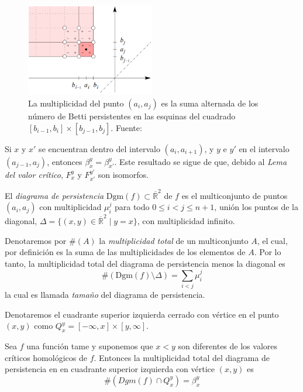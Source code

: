 \begin{figure}[!ht]
\centering
\includegraphics[width=0.5\textwidth]{include/figuras/multiplicidadEsquinas.png} 
\caption{La multiplicidad del punto $(a_i, a_j)$ es la suma alternada de los número de Betti persistentes en las esquinas del cuadrado $[b_{i-1}, b_i]\times[b_{j-1}, b_j]$. Fuente: \cite{Cohen-Steiner2007}}
\label{ref:multiplicidadDiagrama}
\end{figure}

\begin{remark}
Si $x$ y $x'$ se encuentran dentro del intervalo $(a_i, a_{i+1})$, y $y$ e $y'$ en el intervalo $(a_{j-1}, a_j)$, entonces $\beta_{x}^{y} = \beta_{x'}^{y}$. Este resultado se sigue de que, debido al \emph{Lema del valor crítico}, $F_{x}^{y}$ y $F_{x'}^{y'}$ son isomorfos.
\end{remark}

\begin{definition}
El \emph{diagrama de persistencia} $\text{Dgm}(f) \subset \overline{\mathbb{R}}^2$ de $f$ es el multiconjunto de puntos $(a_i, a_j)$ con multiplicidad $\mu_{i}^{j}$ para todo $0 \leq i < j \leq n+1$, unión los puntos de la diagonal, $\Delta=\{(x, y) \in \overline{\mathbb{R}}^2 \mid y = x\}$, con multiplicidad infinito.
\end{definition}

Denotaremos por $\#(A)$ la \emph{multiplicidad total} de un multiconjunto $A$, el cual, por definición es la suma de las multiplicidades de los elementos de $A$. Por lo tanto, la multiplicidad total del diagrama de persistencia menos la diagonal es
\[
\#(\text{Dgm}(f) \setminus \Delta) = \sum_{i < j} \mu_{i}^{j}
\]
la cual es llamada \emph{tamaño} del diagrama de persistencia.

Denotaremos el cuadrante superior izquierda cerrado con vértice en el punto $(x, y)$ como $Q_{x}^{y} = [-\infty, x] \times [y, \infty]$.

\begin{lemma}
Sea $f$ una función tame y suponemos que $x < y$ son diferentes de los valores críticos homológicos de $f$. Entonces la multiplicidad total del diagrama de persistencia en en cuadrante superior izquierda con vértice $(x, y)$ es
\[
\#(Dgm(f) \cap Q_{x}^{y})= \beta_{x}^{y}
\]
\end{lemma}

